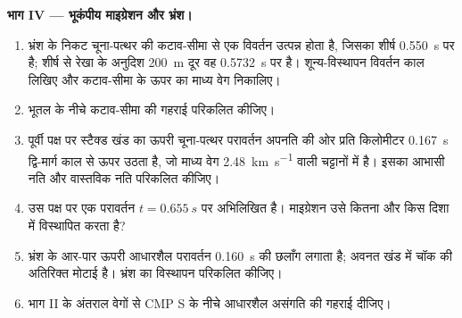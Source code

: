 \begin{problem}
\noindent\textbf{भाग IV --- भूकंपीय माइग्रेशन और भ्रंश।}
\begin{enumerate}[resume]
  \item भ्रंश के निकट चूना-पत्थर की कटाव-सीमा से एक विवर्तन उत्पन्न होता है,
        जिसका शीर्ष \qty{0.550}{s} पर है; शीर्ष से रेखा के अनुदिश \qty{200}{m} दूर
        वह \qty{0.5732}{s} पर है। शून्य-विस्थापन विवर्तन काल लिखिए और
        कटाव-सीमा के ऊपर का माध्य वेग निकालिए।
  \item भूतल के नीचे कटाव-सीमा की गहराई परिकलित कीजिए।
  \item पूर्वी पक्ष पर स्टैक्ड खंड का ऊपरी चूना-पत्थर परावर्तन अपनति की ओर
        प्रति किलोमीटर \qty{0.167}{s} द्वि-मार्ग काल से ऊपर उठता है,
        जो माध्य वेग \qty{2.48}{km.s^{-1}} वाली चट्टानों में है। इसका आभासी नति और
        वास्तविक नति परिकलित कीजिए।
  \item उस पक्ष पर एक परावर्तन $t = \qty{0.655}{s}$ पर अभिलिखित है। माइग्रेशन
        उसे कितना और किस दिशा में विस्थापित करता है?
  \item भ्रंश के आर-पार ऊपरी आधारशैल परावर्तन \qty{0.160}{s} की छलाँग लगाता है;
        अवनत खंड में चॉक की अतिरिक्त मोटाई है। भ्रंश का विस्थापन
        परिकलित कीजिए।
  \item भाग II के अंतराल वेगों से CMP S के नीचे आधारशैल असंगति की
        गहराई दीजिए।
\end{enumerate}
\end{problem}
